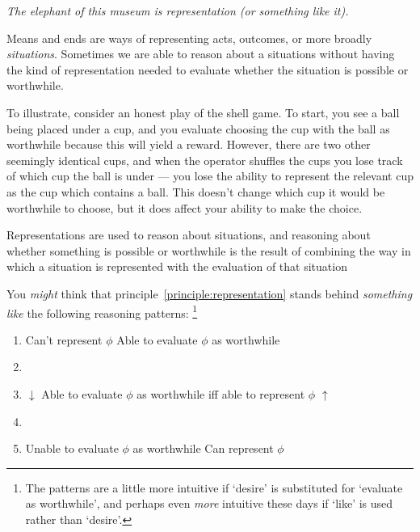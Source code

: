 \documentclass[10pt]{article}
\begin{document}
\begin{center}
  \emph{The elephant of this museum is representation (or something like it).}
\end{center}

Means and ends are ways of representing acts, outcomes, or more broadly \emph{situations}.
Sometimes we are able to reason about a situations without having the kind of representation needed to evaluate whether the situation is possible or worthwhile.

To illustrate, consider an honest play of the shell game.
To start, you see a ball being placed under a cup, and you evaluate choosing the cup with the ball as worthwhile because this will yield a reward.
However, there are two other seemingly identical cups, and when the operator shuffles the cups you lose track of which cup the ball is under --- you lose the ability to represent the relevant cup as the cup which contains a ball.
This doesn't change which cup it would be worthwhile to choose, but it does affect your ability to make the choice.

\begin{principle}\label{principle:representation}
  Representations are used to reason about situations, and reasoning about whether something is possible or worthwhile is the result of combining the way in which a situation is represented with the evaluation of that situation
\end{principle}

You \emph{might} think that principle~\ref{principle:representation} stands behind \emph{something like} the following reasoning patterns:\nolinebreak
\footnote{The patterns are a little more intuitive if `desire' is substituted for `evaluate as worthwhile', and perhaps even \emph{more} intuitive these days if `like' is used rather than `desire'.}

\begin{center}
  \begin{enumerate}[label=]
  \item \hfill Can't represent \(\phi\) \hfill Able to evaluate \(\phi\) as worthwhile \hfill \mbox{}
  \item
  \item \hfill \(\downarrow\) \qquad Able to evaluate \(\phi\) as worthwhile iff able to represent \(\phi\) \qquad \(\uparrow\) \hfill \mbox{}
  \item
  \item \hfill Unable to evaluate \(\phi\) as worthwhile \hfill Can represent \(\phi\) \hfill \mbox{}
  \end{enumerate}
\end{center}
\end{document}
